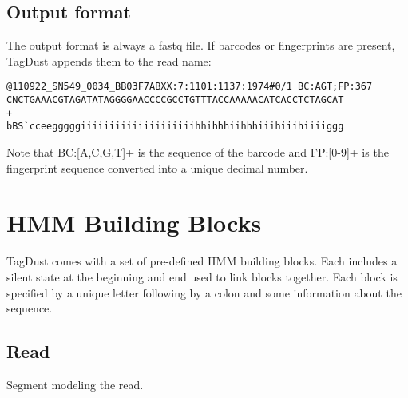 \documentclass[11pt,a4paper,oneside]{book}
\begin{document}
\subsection{Output format}
The output format is always a fastq file. If barcodes or fingerprints are present, TagDust appends them to the read name: 

{\small
\begin{verbatim}
@110922_SN549_0034_BB03F7ABXX:7:1101:1137:1974#0/1 BC:AGT;FP:367
CNCTGAAACGTAGATATAGGGGAACCCCGCCTGTTTACCAAAAACATCACCTCTAGCAT
+
bBS`cceegggggiiiiiiiiiiiiiiiiiiiihhihhhiihhhiiihiiihiiiiggg
\end{verbatim}
}

Note that BC:[A,C,G,T]+ is the sequence of the barcode and FP:[0-9]+ is the fingerprint sequence converted into a unique decimal number.
\newpage

\section{HMM Building Blocks}
TagDust comes with a set of pre-defined HMM building blocks. Each includes a silent state at the beginning and end used to link blocks together. Each block is specified by a unique letter following by a colon and some information about the sequence. 


\subsection{Read}
Segment modeling the read. \\

\begin{figure}[H]
\centering
{}
\end{figure}
\end{document}
